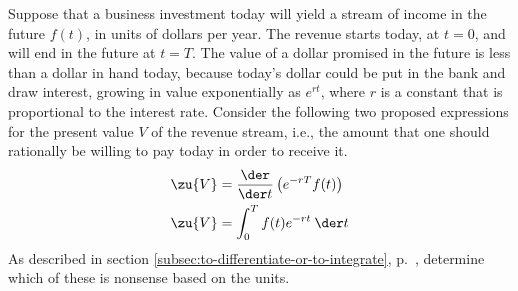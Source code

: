 Suppose that a business investment today will yield a stream of income
in the future $f(t)$, in units of dollars per year. The revenue starts today, at $t=0$,
and will end in the future at $t=T$.
The value of a dollar promised
in the future is less than a dollar in hand today, because today's dollar could
be put in the bank and draw interest, growing in value exponentially as $e^{rt}$, where $r$ is a constant
that is proportional to the interest rate. 
Consider the following two proposed expressions for the present value $V$ of the revenue
stream, i.e., the amount that one should rationally be willing to pay today in order to receive it.
\begin{align*}
  \zu{V} &= \frac{\der}{\der t} \left(e^{-rT}f(t)\right) \\
  \zu{V} &= \int_0^T f(t)e^{-rt}\:\der t
\end{align*}
As described in
section \ref{subsec:to-differentiate-or-to-integrate}, p.~\pageref{subsec:to-differentiate-or-to-integrate},
determine which of these is nonsense based on the units.
